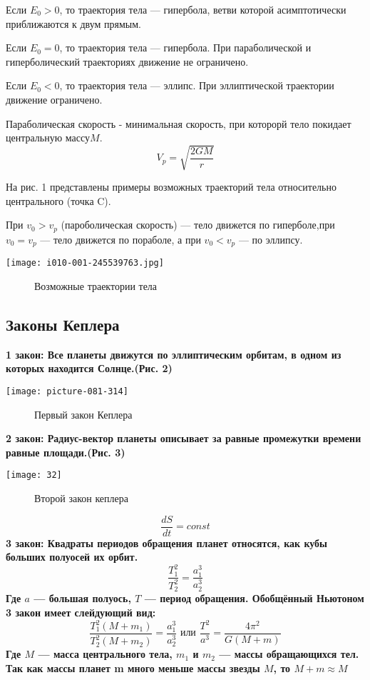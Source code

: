 \documentclass[10pt,a5paper]{article}
\begin{document}
Если $E_0>0$, то траектория тела --- гипербола, ветви которой асимптотически приближаются к двум прямым.

Если $E_0=0$, то траектория тела --- гипербола. При параболической и гиперболический траекториях движение не ограничено.

Если $E_0<0$, то траектория тела --- эллипс. При эллиптической траектории движение ограничено.

Параболическая скорость - минимальная скорость, при которорй тело покидает центральную массу$M$.$$V_p=\sqrt{\frac{2GM}{r}}$$

На рис. 1 представлены примеры возможных траекторий тела относительно центрального (точка C).

При $v_0>v_p$ (пароболическая скорость) --- тело движется по гиперболе,при $v_0=v_p$ --- тело движется по пораболе, а при $v_0<v_p$ --- по эллипсу.
\begin{center}
\texttt{[image: i010-001-245539763.jpg]}
\begin{figure}[h!]
\caption{ Возможные траектории тела}
\end{figure}
\end{center}
\subsection{Законы Кеплера}

\bfseries 1 закон: \mdseries  Все планеты движутся по эллиптическим орбитам, в одном из которых находится Солнце.(Рис. 2)
\begin{center}
\texttt{[image: picture-081-314]}
\begin{figure}[h!]
\caption {Первый закон Кеплера}
\end{figure}
\end{center}

\bfseries 2 закон: \mdseries Радиус-вектор планеты описывает за равные промежутки времени равные площади.(Рис. 3)
\begin{center}
\texttt{[image: 32]}
\begin{figure}[h!]
\caption {Второй закон кеплера}
\end{figure}
\end{center}$$\frac{dS}{dt}=const$$
\bfseries 3 закон: \mdseries Квадраты периодов обращения планет относятся, как кубы больших полуосей их орбит.
$$\frac{T^2_1}{T^2_2}=\frac{a^3_1}{a^3_2}$$
Где $a$ --- большая полуось, $T$ --- период обращения.
Обобщённый Ньютоном 3 закон имеет слейдующий вид:
$$\frac{T^2_1(M+m_1)}{T^2_2(M+m_2)}=\frac{a^3_1}{a^3_2} \text{ или } \frac{T^2}{a^3}=\frac{4\pi^2}{G(M+m)}$$
Где $M$ --- масса центрального тела, $m_1$ и $m_2$ --- массы обращающихся тел. Так как массы планет m много меньше массы звезды $M$, то $M+m\approx M$
\end{document}
